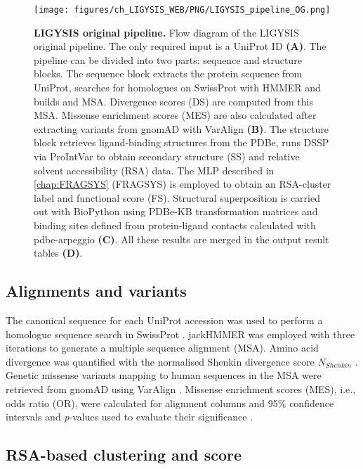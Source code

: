 \begin{figure}[htbp!]
    \centering
    \texttt{[image: figures/ch\_LIGYSIS\_WEB/PNG/LIGYSIS\_pipeline\_OG.png]}
    \caption[LIGYSIS original pipeline]{\textbf{LIGYSIS original pipeline.} Flow diagram of the LIGYSIS original pipeline. The only required input is a UniProt ID \textbf{(A)}. The pipeline can be divided into two parts: sequence and structure blocks. The sequence block extracts the protein sequence from UniProt, searches for homologues on SwissProt with HMMER and builds and MSA. Divergence scores (DS) are computed from this MSA. Missense enrichment scores (MES) are also calculated after extracting variants from gnomAD with VarAlign \textbf{(B)}. The structure block retrieves ligand-binding structures from the PDBe, runs DSSP via ProIntVar to obtain secondary structure (SS) and relative solvent accessibility (RSA) data. The MLP described in \autoref{chap:FRAGSYS} (FRAGSYS) is employed to obtain an RSA-cluster label and functional score (FS). Structural superposition is carried out with BioPython using PDBe-KB transformation matrices and binding sites defined from protein-ligand contacts calculated with pdbe-arpeggio \textbf{(C)}. All these results are merged in the output result tables \textbf{(D)}.}
    \label{fig:ligysis_pipeline_OG}
\end{figure}

\subsection{Alignments and variants}

The canonical sequence for each UniProt accession was used to perform a homologue sequence search in SwissProt \cite{BOUTET_2016_UNIPROT}. jackHMMER \cite{EDDY_1995_HMMER} was employed with three iterations to generate a multiple sequence alignment (MSA). Amino acid divergence was quantified with the normalised Shenkin \cite{SHENKIN_1991_SCORE} divergence score $N_{Shenkin}$ \cite{UTGES_2021_ANKS}. Genetic missense variants mapping to human sequences in the MSA were retrieved from gnomAD \cite{KARCZEWSKI_2020_GNOMAD} using VarAlign \cite{MACGOWAN_2017_VARIANTS}. Missense enrichment scores (MES), i.e., odds ratio (OR), were calculated for alignment columns \cite{MACGOWAN_2024_VARIANTS} and 95\% confidence intervals and \textit{p}-values used to evaluate their significance \cite{SZUMILAS_2010_ODDSRATIOS}. %

\subsection{RSA-based clustering and score}

